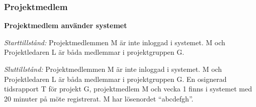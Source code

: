 \documentclass[a4paper]{article}
\begin{document}
\subsubsection{Projektmedlem}
\begin{ST}
\item \textbf{Projektmedlem använder systemet}

\emph{Starttillstånd:} Projektmedlemmen M är inte inloggad i systemet. M och Projektledaren L är båda medlemmar i projektgruppen G.

\emph{Sluttillstånd:} Projektmedlemmen M är inte inloggad i systemet. M och Projektledaren L är båda medlemmar i projektgruppen G. En osignerad tidsrapport T för projekt G, projektmedlem M och vecka 1 finns i systemet med 20 minuter på möte registrerat. M har lösenordet ``abcdefgh''.


\end{ST}
\end{document}
